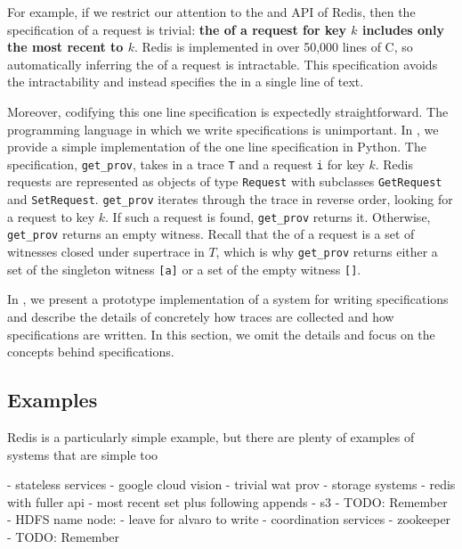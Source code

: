 For example, if we restrict our attention to the \kvget{} and \kvset{} API of
Redis, then the \watprovenance{} specification of a \kvget{} request is
trivial: \textbf{the \watprovenance{} of a \kvget{} request for key $k$
includes only the most recent \kvset{} to $k$}. Redis is implemented in over
50,000 lines of C, so automatically inferring the \watprovenance{} of a
\kvget{} request is intractable. This \watprovenance{} specification avoids the
intractability and instead specifies the \watprovenance{} in a single line of
text.

Moreover, codifying this one line \watprovenance{} specification is expectedly
straightforward. The programming language in which we write \watprovenance{}
specifications is unimportant. In , we provide a simple
implementation of the one line \watprovenance{} specification in Python. The
specification, \texttt{get\_prov}, takes in a trace \texttt{T} and a \kvget{}
request \texttt{i} for key $k$. Redis requests are represented as objects of
type \texttt{Request} with subclasses \texttt{GetRequest} and
\texttt{SetRequest}.  \texttt{get\_prov} iterates through the trace in reverse
order, looking for a \kvset{} request to key $k$. If such a \kvset{} request is
found, \texttt{get\_prov} returns it. Otherwise, \texttt{get\_prov} returns an
empty witness. Recall that the \watprovenance{} of a request is a set of
witnesses closed under supertrace in $T$, which is why \texttt{get\_prov}
returns either a set of the singleton witness \texttt{[a]} or a set of the
empty witness \texttt{[]}.

{}

In , we present a prototype
implementation of a system for writing \watprovenance{} specifications and
describe the details of concretely how traces are collected and how
\watprovenance{} specifications are written. In this section, we omit the
details and focus on the concepts behind \watprovenance{} specifications.

\subsection{Examples}
Redis is a particularly simple example, but there are plenty of examples of systems that are simple too

- stateless services
  - google cloud vision
  - trivial wat prov
- storage systems
  - redis with fuller api
  - most recent set plus following appends
  - s3
    - TODO: Remember
  - HDFS name node:
    - leave for alvaro to write
- coordination services
  - zookeeper
    - TODO: Remember


